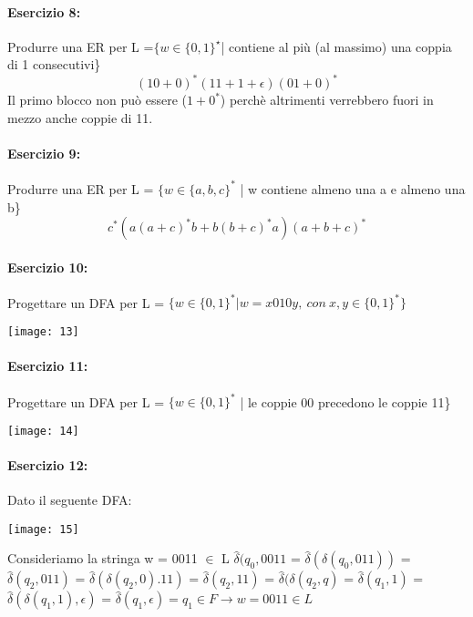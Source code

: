 \documentclass[12pt, a4paper, openany, oneside]{book}
\begin{document}
\paragraph{Esercizio 8: }Produrre una ER per L =$ \{w\in \{0,1\}^{\star} $| 
contiene al più (al massimo) una coppia di 1 consecutivi\}
\[
	(10+0)^{*}(11+1+\epsilon)(01+0)^{*}
\]
Il primo blocco non può essere ($1+0^{*}$) perchè altrimenti verrebbero fuori in 
mezzo anche coppie di 11.
\paragraph{Esercizio 9: }
Produrre una ER per L = $\{w \in \{a,b,c\}^{*}$ | w contiene almeno una a e almeno
una b\}
\[
	c^{*}(a(a+c)^{*}b+b(b+c)^{*}a)(a+b+c)^{*}
\]
\paragraph{Esercizio 10: }
Progettare un DFA per L = $\{w \in \{0,1\}^{*} | w = x010y, ~con~x,y\in\{0,1\}^{*}\}$ 
\begin{center}
\texttt{[image: 13]}
\end{center}
\paragraph{Esercizio 11:}
Progettare un DFA per L = $\{w \in \{0,1\}^{*}$ | le coppie 00 precedono le 
coppie 11\}
\begin{center}
\texttt{[image: 14]}
\end{center}
\paragraph{Esercizio 12:}

Dato il seguente DFA:
\begin{center}
\texttt{[image: 15]}
\end{center}
Consideriamo la stringa w = 0011 $\in$ L
$\widehat{\delta}(q_{0}, 0011$ = $\widehat{\delta}(\delta(q_{0},011))$ =
$\widehat{\delta}(q_{2},011)$ = $\widehat{\delta}(\delta(q_{2},0).11)$ = 
$\widehat{\delta}(q_{2},11)$ = $\widehat{\delta}(\delta(q_{2},q)$ = 
$\widehat{\delta}(q_{1},1)$ = $\widehat{\delta}(\delta(q_{1},1),\epsilon)$ = 
$\widehat{\delta}(q_{1}, \epsilon) = q_{1}\in F \to w = 0011 \in L$
\end{document}
